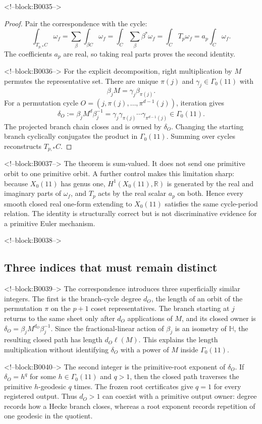 \documentclass[11pt]{article}
\theoremstyle{definition}
\theoremstyle{remark}
\newcommand{\G}{\Gamma_0(11)}
\newcommand{\HH}{\mathbb H}
\newcommand{\RR}{\mathbb R}
\begin{document}
<!--block:B0035-->
\begin{proof}
Pair the correspondence with the cycle:
\[
\int_{T_{p,*}C}\omega_f
=\sum_\beta\int_{\beta C}\omega_f
=\int_C\sum_\beta\beta^*\omega_f
=\int_CT_p\omega_f
=a_p\int_C\omega_f.
\]
The coefficients $a_p$ are real, so taking real parts proves the second identity.

<!--block:B0036-->
For the explicit decomposition, right multiplication by $M$ permutes the representative set. There are unique $\pi(j)$ and $\gamma_j\in\G$ with
\[
\beta_jM=\gamma_j\beta_{\pi(j)}.
\]
For a permutation cycle $O=(j,\pi(j),\ldots,\pi^{d-1}(j))$, iteration gives
\[
\delta_O:=\beta_jM^d\beta_j^{-1}
=\gamma_j\gamma_{\pi(j)}\cdots\gamma_{\pi^{d-1}(j)}\in\G.
\]
The projected branch chain closes and is owned by $\delta_O$. Changing the starting branch cyclically conjugates the product in $\G$. Summing over cycles reconstructs $T_{p,*}C$.
\end{proof}

<!--block:B0037-->
The theorem is sum-valued. It does not send one primitive orbit to one primitive orbit. A further control makes this limitation sharp: because $X_0(11)$ has genus one, $H^1(X_0(11),\RR)$ is generated by the real and imaginary parts of $\omega_f$, and $T_p$ acts by the real scalar $a_p$ on both. Hence every smooth closed real one-form extending to $X_0(11)$ satisfies the same cycle-period relation. The identity is structurally correct but is not discriminative evidence for a primitive Euler mechanism.

<!--block:B0038-->
\subsection{Three indices that must remain distinct}

<!--block:B0039-->
The correspondence introduces three superficially similar integers. The first is the branch-cycle degree $d_O$, the length of an orbit of the permutation $\pi$ on the $p+1$ coset representatives. The branch starting at $j$ returns to the same sheet only after $d_O$ applications of $M$, and its closed owner is $\delta_O=\beta_jM^{d_O}\beta_j^{-1}$. Since the fractional-linear action of $\beta_j$ is an isometry of $\HH$, the resulting closed path has length $d_O\ell(M)$. This explains the length multiplication without identifying $\delta_O$ with a power of $M$ inside $\G$.

<!--block:B0040-->
The second integer is the primitive-root exponent of $\delta_O$. If $\delta_O=h^q$ for some $h\in\G$ and $q>1$, then the closed path traverses the primitive $h$-geodesic $q$ times. The frozen root certificates give $q=1$ for every registered output. Thus $d_O>1$ can coexist with a primitive output owner: degree records how a Hecke branch closes, whereas a root exponent records repetition of one geodesic in the quotient.
\end{document}
